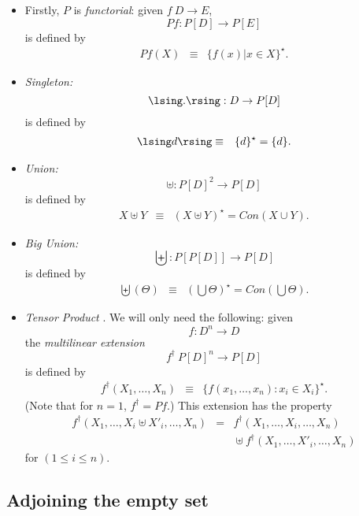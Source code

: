 \begin{itemize}

\item Firstly, $P$ is {\em functorial}: given $f \: D \rightarrow E$,
\[ P f : P[D] \rightarrow P[E] \]
is defined by
\begin{eqnarray*}
P f (X) & \equiv & \{ f(x) | x \in X \}^{\star} .
\end{eqnarray*}

\item {\em Singleton:}
\[ \lsing . \rsing : D \rightarrow P[D] \]
is defined by
\begin{eqnarray*}
\lsing d \rsing & \equiv & \{ d \}^{\star} = \{ d \} .
\end{eqnarray*}

\item {\em Union:}
\[ \uplus : P[D]^{2} \rightarrow P[D] \]
is defined by
\begin{eqnarray*}
X \uplus Y & \equiv & (X \uplus Y)^{\star} = Con(X \cup Y) .
\end{eqnarray*}

\item {\em Big Union:}
\[ \biguplus : P[P[D]] \rightarrow P[D] \]
is defined by
\begin{eqnarray*}
\biguplus ( \Theta ) & \equiv & ( \bigcup \Theta )^{\star} = Con ( \bigcup \Theta ) .
\end{eqnarray*}

\item {\em Tensor Product} \cite{HP79}. We will only need the following: given
\[ f : D^{n} \rightarrow D \]
the {\em multilinear extension}
\[ f^{\dagger} \: P[D]^{n} \rightarrow P[D] \]
is defined by
\begin{eqnarray*}
f^{\dagger} (X_{1}, \ldots , X_{n} ) & \equiv & \{ f(x_{1}, \ldots , x_{n} ) : x_{i} \in X_{i} \}^{\star} .
\end{eqnarray*}
(Note that for $n = 1$, $f^{\dagger} = P f$.) This extension has the property
\begin{eqnarray*}
f^{\dagger} (X_{1}, \ldots , X_{i} \uplus X'_{i}, \ldots , X_{n}) & = & f^{\dagger} (X_{1}, \ldots , X_{i}, \ldots , X_{n}) \\
& & \mbox{} \uplus f^{\dagger} (X_{1}, \ldots ,  X'_{i}, \ldots , X_{n})  
\end{eqnarray*}
for $(1 \leq i \leq n)$.
\end{itemize}

\subsection*{Adjoining the empty set}

